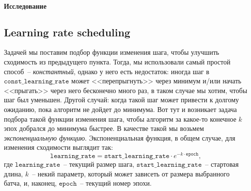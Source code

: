 \documentclass[12pt, a4paper, oneside, final]{article}
\begin{document}
	\paragraph{Исследование }
	\subsection*{Learning rate scheduling}
	Задачей мы поставим подбор функции изменения шага, чтобы улучшить сходимость из предыдущего пункта.
	Тогда, мы использовали самый простой способ~-- \textit{константный}, однако у него есть недостаток: иногда шаг в $\mathtt{const\_learning\_rate}$ может <<перепрыгнуть>> через минимум и/или начать <<прыгать>> через него бесконечно много раз, в таком случае мы хотим, чтобы шаг был уменьшен.
	Другой случай: когда такой шаг может привести к долгому ожиданию, пока алгоритм не дойдет до минимума.
	Вот тут и возникает задача подбора такой функции изменения шага, чтобы алгоритм за какое-то конечное $k$ эпох добрался до минимума быстрее. 
	В качестве такой мы возьмем \textit{экспоненциальную функцию}.
	Экспоненциальная функция, в общем случае, для изменения сходимости выглядит так:
	\[
		\mathtt{learning\_rate} = \mathtt{start\_learning\_rate} \cdot e^{-k \cdot \mathtt{epoch}},
	\] где $\mathtt{learning\_rate}$~-- текущий размер шага, $\mathtt{start\_learning\_rate}$~-- стартовая длина, $k$~-- некий параметр, который может зависеть от размера выбранного батча, и, наконец, $\mathtt{epoch}$~-- текущий номер эпохи.
\end{document}
